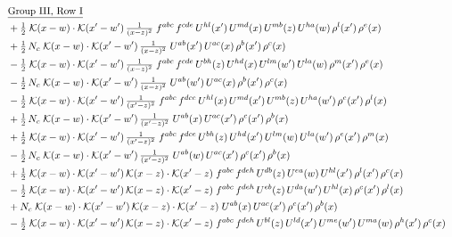 \documentclass[10pt]{article}
\numberwithin{equation}{section}
\begin{document}
\begin{align}
&\quad\underline{\text{Group III, Row I}}\notag\\
&\quad +\tfrac{1}{2}\;\mathcal{K}(x-w)\cdot\mathcal{K}(x'-w')\,\tfrac{1}{(x-z)^{2}}\;f^{abc}\,f^{cde}\,U^{hl}(x')\,U^{md}(x)\,U^{mb}(z)\,U^{ha}(w)\,\rho^{l}(x')\,\rho^{e}(x)\notag\\
&\quad +\tfrac{1}{2}\,N_c\;\mathcal{K}(x-w)\cdot\mathcal{K}(x'-w')\,\tfrac{1}{(x-z)^{2}}\;U^{ab}(x')\,U^{ac}(x)\,\rho^{b}(x')\,\rho^{c}(x)\notag\\
&\quad -\tfrac{1}{2}\;\mathcal{K}(x-w)\cdot\mathcal{K}(x'-w')\,\tfrac{1}{(x-z)^{2}}\;f^{abc}\,f^{cde}\,U^{bh}(z)\,U^{hd}(x)\,U^{lm}(w')\,U^{la}(w)\,\rho^{m}(x')\,\rho^{e}(x)\notag\\
&\quad -\tfrac{1}{2}\,N_c\;\mathcal{K}(x-w)\cdot\mathcal{K}(x'-w')\,\tfrac{1}{(x-z)^{2}}\;U^{ab}(w')\,U^{ac}(x)\,\rho^{b}(x')\,\rho^{c}(x)\notag\\
&\quad -\tfrac{1}{2}\;\mathcal{K}(x-w)\cdot\mathcal{K}(x'-w')\,\tfrac{1}{(x'-z)^{2}}\;f^{abc}\,f^{dce}\,U^{hl}(x)\,U^{md}(x')\,U^{mb}(z)\,U^{ha}(w')\,\rho^{e}(x')\,\rho^{l}(x)\notag\\
&\quad +\tfrac{1}{2}\,N_c\;\mathcal{K}(x-w)\cdot\mathcal{K}(x'-w')\,\tfrac{1}{(x'-z)^{2}}\;U^{ab}(x)\,U^{ac}(x')\,\rho^{c}(x')\,\rho^{b}(x)\notag\\
&\quad +\tfrac{1}{2}\;\mathcal{K}(x-w)\cdot\mathcal{K}(x'-w')\,\tfrac{1}{(x'-z)^{2}}\;f^{abc}\,f^{dce}\,U^{bh}(z)\,U^{hd}(x')\,U^{lm}(w)\,U^{la}(w')\,\rho^{e}(x')\,\rho^{m}(x)\notag\\
&\quad -\tfrac{1}{2}\,N_c\;\mathcal{K}(x-w)\cdot\mathcal{K}(x'-w')\,\tfrac{1}{(x'-z)^{2}}\;U^{ab}(w)\,U^{ac}(x')\,\rho^{c}(x')\,\rho^{b}(x)\notag\\
&\quad +\tfrac{1}{2}\;\mathcal{K}(x-w)\cdot\mathcal{K}(x'-w')\,\mathcal{K}(x-z)\cdot\mathcal{K}(x'-z)\;f^{abc}\,f^{deh}\,U^{db}(z)\,U^{ea}(w)\,U^{hl}(x')\,\rho^{l}(x')\,\rho^{c}(x)\notag\\
&\quad -\tfrac{1}{2}\;\mathcal{K}(x-w)\cdot\mathcal{K}(x'-w')\,\mathcal{K}(x-z)\cdot\mathcal{K}(x'-z)\;f^{abc}\,f^{deh}\,U^{eb}(z)\,U^{da}(w')\,U^{hl}(x)\,\rho^{c}(x')\,\rho^{l}(x)\notag\\
&\quad +N_c\;\mathcal{K}(x-w)\cdot\mathcal{K}(x'-w')\,\mathcal{K}(x-z)\cdot\mathcal{K}(x'-z)\;U^{ab}(x)\,U^{ac}(x')\,\rho^{c}(x')\,\rho^{b}(x)\notag\\
&\quad -\tfrac{1}{2}\;\mathcal{K}(x-w)\cdot\mathcal{K}(x'-w')\,\mathcal{K}(x-z)\cdot\mathcal{K}(x'-z)\;f^{abc}\,f^{deh}\,U^{bl}(z)\,U^{ld}(x')\,U^{me}(w')\,U^{ma}(w)\,\rho^{h}(x')\,\rho^{c}(x)\notag\\

\end{align}
\end{document}
